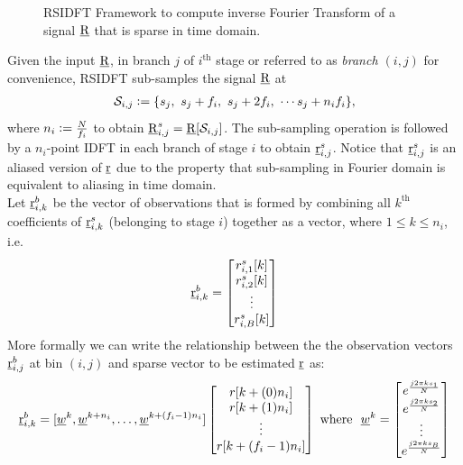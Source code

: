 \begin{enumerate}
	 \begin{figure}[h!]
	 	\begin{center}
	 	\resizebox{0.6\textwidth}{!}{}
	 	\end{center}	   
	 	\caption{ RSIDFT Framework to compute inverse Fourier Transform of a signal $\underline{\mathrm{R}}$ that is sparse in time domain. }\label{fig:rsidft}
	\vspace{5 pt}
	 \end{figure}
	 	
	 Given the input $\underline{\mathrm{R}}$, in branch $j$ of $i^{\text{th}}$ stage or referred to as \textit{branch $(i,j)$} for convenience, RSIDFT sub-samples the signal $\underline{\mathrm{R}}$ at
\begin{align}
\label{Eqn:SamplingSets}
	 \mathcal{S}_{i,j} \mathrel{\mathop:}= \{s_j,\ s_j + f_i,\ s_j + 2f_i,\ \cdots s_j + n_i f_i\},
\end{align}
where $n_i\mathrel{\mathop:}= \frac{N}{f_i}$ to obtain $\underline{\mathrm{R}}^{s}_{i,j}=\underline{\mathrm{R}}[\mathcal{S}_{i,j}]$. The sub-sampling operation is followed by a $n_i$-point IDFT in each branch of stage $i$ to obtain $ \underline{\mathrm{r}}^{s}_{i,j}$. Notice that $ \underline{\mathrm{r}}^{s}_{i,j}$ is an aliased version of $\underline{\mathrm{r}}$ due to the property that sub-sampling in Fourier domain is equivalent to aliasing in time domain.\\

	 Let $\underline{\mathrm{r}}^{b}_{i,k}$ be the  vector of observations that is formed by combining all $k^{\text{th}}$ coefficients of $\underline{\mathrm{r}}^{s}_{i,k}$ (belonging to stage $i$) together as a vector, where $1 \leq k\leq n_i$, i.e.
\[
	  \underline{\mathrm{r}}^{b}_{i,k} = \begin{bmatrix}
	 r^{s}_{i,1}[k] \\
	 r^{s}_{i,2}[k] \\
	 \vdots\\
	 r^{s}_{i,B}[k]
	 \end{bmatrix}  
\]
More formally we can write the relationship between the the observation vectors $\underline{\mathrm{r}}^b_{i,j}$ at bin $(i,j)$ and sparse vector to be estimated $\underline{\mathrm{r}}$ as:
\begin{align}
\label{Eqn:Generator Equation}
\underline{\mathrm{r}}^b_{i,k}=[\underline{w}^{k},\underline{w}^{k+n_i},\ldots, \underline{w}^{k+(f_i-1)n_i}]
\begin{bmatrix}
	 r[k+(0)n_i] \\
	 r[k+(1)n_i] \\
	 \vdots\\
	 r[k+(f_i-1)n_i]
\end{bmatrix}
\text{ where } ~  \underline{w}^{k}=
\begin{bmatrix}
e^{\frac{j2\pi ks_1}{N}}\\
e^{\frac{j2\pi ks_2}{N}}\\
\vdots\\
e^{\frac{j2\pi ks_B}{N}}
\end{bmatrix}
\end{align}


\end{enumerate}
